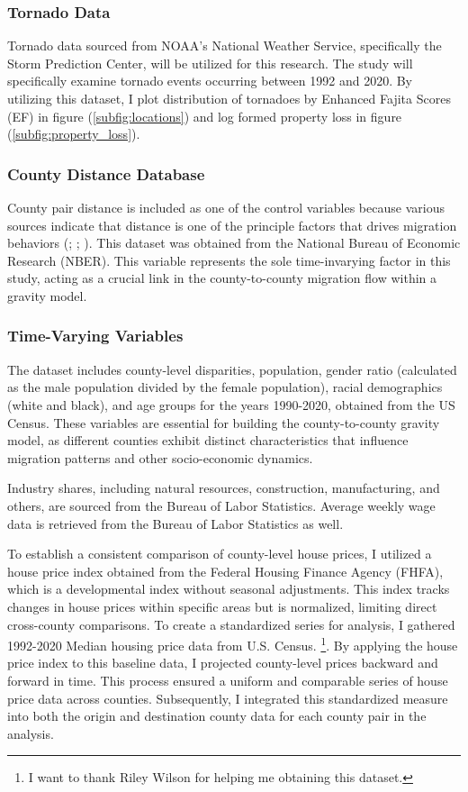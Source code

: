 \documentclass[letterpaper]{article}
\let\oldcite\cite
\renewcommand{\cite}[1]{\textcolor{blue}{\oldcite{#1}}}
\begin{document}
\subsubsection{Tornado Data}
Tornado data sourced from NOAA's National Weather Service, specifically the Storm Prediction Center, will be utilized for this research. The study will specifically examine tornado events occurring between 1992 and 2020. By utilizing this dataset, I plot distribution of tornadoes by Enhanced Fajita Scores (EF) in figure (\ref{subfig:locations}) and log formed property loss in figure (\ref{subfig:property_loss}).


\subsubsection{County Distance Database}
County pair distance is included as one of the control variables because various sources indicate that distance is one of the principle factors that drives migration behaviors    (\cite{schwartz1973interpreting}; \cite{bogue1949migration}; \cite{sjaastad1962costs}). This dataset was obtained from the National Bureau of Economic Research (NBER). This variable represents the sole time-invarying factor in this study, acting as a crucial link in the county-to-county migration flow within a gravity model.

\subsubsection{Time-Varying Variables}
The dataset includes county-level disparities, population, gender ratio (calculated as the male population divided by the female population), racial demographics (white and black), and age groups for the years 1990-2020, obtained from the US Census. These variables are essential for building the county-to-county gravity model, as different counties exhibit distinct characteristics that influence migration patterns and other socio-economic dynamics.

Industry shares, including natural resources, construction, manufacturing, and others, are sourced from the Bureau of Labor Statistics. Average weekly wage data is retrieved from the Bureau of Labor Statistics as well.

To establish a consistent comparison of county-level house prices, I utilized a house price index obtained from the Federal Housing Finance Agency (FHFA), which is a developmental index without seasonal adjustments. This index tracks changes in house prices within specific areas but is normalized, limiting direct cross-county comparisons. To create a standardized series for analysis, I gathered 1992-2020 Median housing price data from U.S. Census. \footnote{I want to thank Riley Wilson for helping me obtaining this dataset.}. By applying the house price index to this baseline data, I projected county-level prices backward and forward in time. This process ensured a uniform and comparable series of house price data across counties. Subsequently, I integrated this standardized measure into both the origin and destination county data for each county pair in the analysis. 
\end{document}

